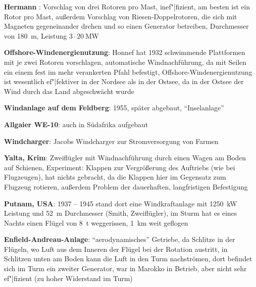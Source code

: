 \textbf{Hermann }:
Vorschlag von drei Rotoren pro Mast,
inef"|fizient,
am besten ist ein Rotor pro Mast,
außerdem Vorschlag von Riesen-Doppelrotoren, die sich mit Magneten gegeneinander drehen und
so einen Generator betreiben,
Durchmesser von \SI{180}{\meter}, Leistung $3 \cdot \SI{20}{\mega\watt}$

\textbf{Offshore-Windenergienutzung}:
Honnef hat 1932 schwimmende Plattformen mit je zwei Rotoren vorschlagen,
automatische Windnachführung, da mit Seilen ein einem fest im mehr verankerten Pfahl befestigt,
Offshore-Windenergienutzung ist wesentlich ef"|fektiver in der Nordsee als in der Ostsee,
da in der Ostsee der Wind durch das Land abgeschwächt wurde

\textbf{Windanlage auf dem Feldberg}:
1955, später abgebaut, "`Inselanlage"'

\textbf{Allgaier WE-10}:
auch in Südafrika aufgebaut

\textbf{Windcharger}:
Jacobs Windcharger zur Stromversorgung von Farmen

\linie
\pagebreak

\textbf{Yalta, Krim}:
Zweiflügler mit Windnachführung durch einen Wagen am Boden auf Schienen,
Experiment: Klappen zur Vergrößerung des Auftriebs (wie bei Flugzeugen),
hat nichts gebracht, da die Klappen hier im Gegensatz zum Flugzeug rotieren,
außerdem Problem der dauerhaften, langfristigen Befestigung

\textbf{Putnam, USA}:
1937 -- 1945 stand dort eine Windkraftanlage mit \SI{1250}{\kilo\watt} Leistung und
\SI{52}{\meter} Durchmesser (Smith, Zweiflügler),
im Sturm hat es eines Nachts einen Flügel von \SI{8}{\tonne} weggerissen,
\SI{1}{\kilo\meter} weit geflogen

\textbf{Enfield-Andreau-Anlage}:
"`aerodynamisches"' Getriebe,
da Schlitze in der Flügeln, wo Luft aus dem Inneren der Flügel bei der Rotation austritt,
in Schlitzen unten am Boden kann die Luft in den Turm nachströmen, dort befindet sich im
Turm ein zweiter Generator,
war in Marokko in Betrieb, aber nicht sehr ef"|fizient (zu hoher Widerstand im Turm)

\pagebreak

